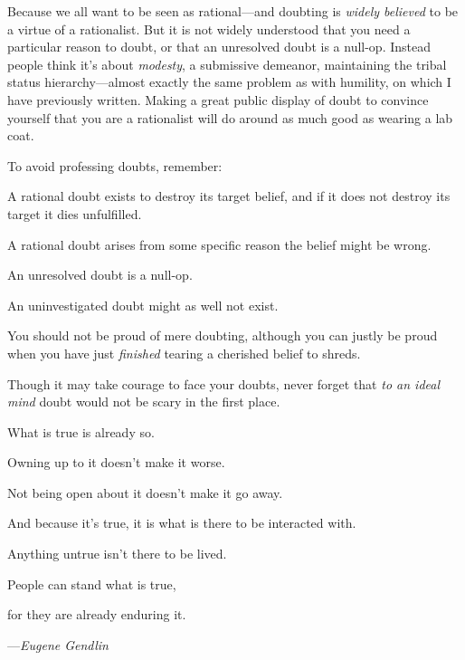 {
 Because we all want to be seen as rational---and doubting is
\textit{widely believed} to be a virtue of a rationalist. But it is not
widely understood that you need a particular reason to doubt, or that
an unresolved doubt is a null-op. Instead people think
it's about \textit{modesty}, a submissive demeanor,
maintaining the tribal status hierarchy---almost exactly the same
problem as with humility, on which I have previously written. Making a
great public display of doubt to convince yourself that you are a
rationalist will do around as much good as wearing a lab coat.}

{
 To avoid professing doubts, remember:}

{
 A rational doubt exists to destroy its target belief, and if it
does not destroy its target it dies unfulfilled.}

{
 A rational doubt arises from some specific reason the belief might
be wrong.}

{
 An unresolved doubt is a null-op.}

{
 An uninvestigated doubt might as well not exist.}

{
 You should not be proud of mere doubting, although you can justly
be proud when you have just \textit{finished} tearing a cherished
belief to shreds.}

{
 Though it may take courage to face your doubts, never forget that
\textit{to an ideal mind} doubt would not be scary in the first place.}

\myendsectiontext


{
 What is true is already so.}

{
 Owning up to it doesn't make it worse.}

{
 Not being open about it doesn't make it go away.}

{
 And because it's true, it is what is there to be
interacted with.}

{
 Anything untrue isn't there to be lived.}

{
 People can stand what is true,}

{
 for they are already enduring it.}

{\raggedleft
 {}---\textit{Eugene Gendlin}
\par}


\bigskip

{
 ~}

\myendsectiontext


